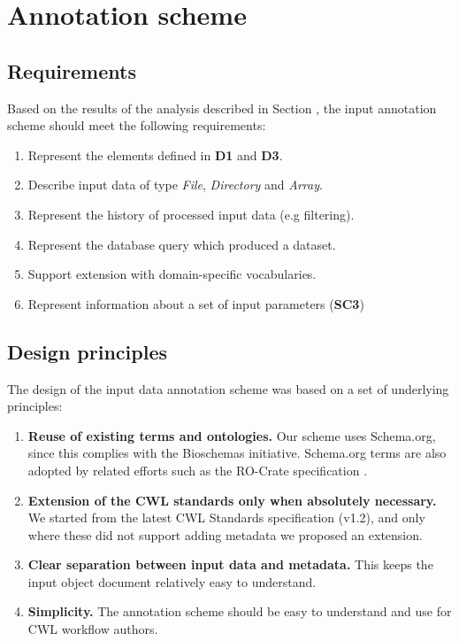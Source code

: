 \section{Annotation scheme}
\label{sup:annotation}


\subsection{Requirements} \label{sec:annot_req}

Based on the results of the analysis described in Section \emph{}, the input annotation scheme should meet the following requirements:

\begin{enumerate}[label=\textbf{IR\arabic*}]
    \item \label{ir:metadata} Represent the elements defined in \textbf{D1} and \textbf{D3}.
    \item \label{ir:types} Describe input data of type \emph{File}, \emph{Directory} and \emph{Array}.
    \item \label{ir:history} Represent the history of processed input data (e.g filtering).
    \item \label{ir:query} Represent the database query which produced a dataset.
    \item \label{ir:extend} Support extension with domain-specific vocabularies.
    \item \label{ir:context} Represent information about a set of input parameters (\textbf{SC3})
\end{enumerate}

\subsection{Design principles}
\label{sec:annot_principles}

The design of the input data annotation scheme was based on a set of underlying principles:

\begin{enumerate}[label=\textbf{IP\arabic*}]
    \item \textbf{Reuse of existing terms and ontologies.} Our scheme uses Schema.org, since this complies with the Bioschemas \cite{grayPotatoSaladProtein2017} initiative. Schema.org terms are also adopted by related efforts such as the RO-Crate specification \cite{soiland-reyesPackagingResearchArtefacts2022}. \label{pr:bioschemas}
    \item \textbf{Extension of the CWL standards only when absolutely necessary.} We started from the latest CWL Standards specification (v1.2), and only where these did not support adding metadata we proposed an extension. \label{pr:current_standards}
    \item \textbf{Clear separation between input data and metadata.} This keeps the input object document relatively easy to understand. \label{pr:separate}
    \item \textbf{Simplicity.} The annotation scheme should be easy to understand and use for CWL workflow authors. \label{pr:simplicity}
\end{enumerate}

